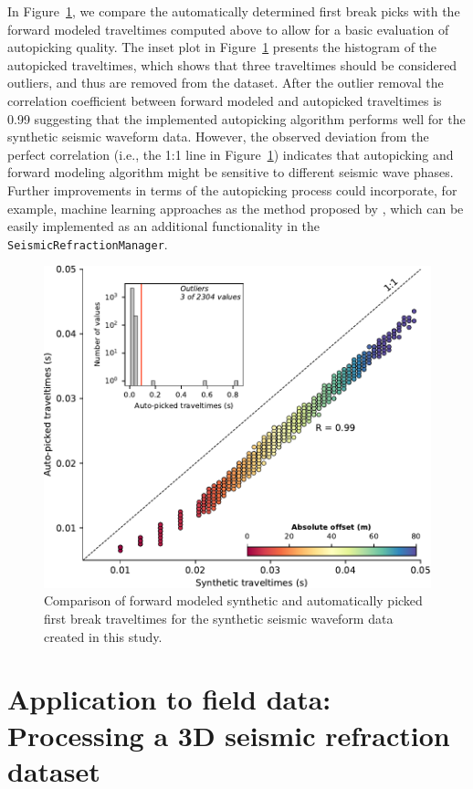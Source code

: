 \documentclass[a4paper,fleqn]{cas-sc}
\begin{document}
In Figure~\ref{fig:pickcomp}, we compare the automatically determined first break picks with the forward modeled traveltimes computed above to allow for a basic evaluation of autopicking quality. The inset plot in Figure~\ref{fig:pickcomp} presents the histogram of the autopicked traveltimes, which shows that three traveltimes should be considered outliers, and thus are removed from the dataset. After the outlier removal the correlation coefficient between forward modeled and autopicked traveltimes is \num{0.99} suggesting that the implemented autopicking algorithm performs well for the synthetic seismic waveform data. However, the observed deviation from the perfect correlation (i.e., the 1:1 line in Figure~\ref{fig:pickcomp}) indicates that autopicking and forward modeling algorithm might be sensitive to different seismic wave phases. Further improvements in terms of the autopicking process could incorporate, for example, machine learning approaches as the method proposed by \citet{duan2020}, which can be easily implemented as an additional functionality in the \texttt{SeismicRefractionManager}.
\begin{figure}
	\centering
	\includegraphics[width=.75\textwidth]{figures/pick_comparison.pdf}
	\caption{Comparison of forward modeled synthetic and automatically picked first break traveltimes for the synthetic seismic waveform data created in this study.}
	\label{fig:pickcomp}
\end{figure}

\section{Application to field data: Processing a 3D seismic refraction dataset}
\end{document}
